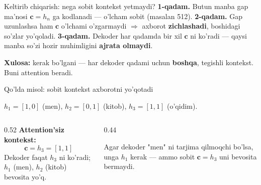 \documentclass[aspectratio=169,11pt]{beamer}
\begin{document}
\begin{frame}{Keltirib chiqarish: nega sobit kontekst yetmaydi?}
  \textbf{1-qadam.} Butun manba gap ma'nosi $\mathbf{c}=h_n$ ga kodlanadi ---
  o'lcham sobit (masalan 512).
  \pause
  \textbf{2-qadam.} Gap uzunlashsa ham $\mathbf{c}$ o'lchami o'zgarmaydi $\Rightarrow$
  axborot \textbf{zichlashadi}, boshidagi so'zlar yo'qoladi.
  \pause
  \textbf{3-qadam.} Dekoder har qadamda bir xil $\mathbf{c}$ ni ko'radi --- qaysi
  manba so'zi hozir muhimligini \textbf{ajrata olmaydi}.
  \begin{tcolorbox}[okbox,top=2pt,bottom=2pt]
    \small \textbf{Xulosa:} kerak bo'lgani --- har dekoder qadami uchun
    \textbf{boshqa}, tegishli kontekst. Buni attention beradi.
  \end{tcolorbox}
\end{frame}

\begin{frame}{Qo'lda misol: sobit kontekst axborotni yo'qotadi}
  \begin{tcolorbox}[defbox,title={Enkoder holatlari (o'lcham 2)}]
    \small $h_1=[1,0]$ (men), $h_2=[0,1]$ (kitob), $h_3=[1,1]$ (o'qidim).
  \end{tcolorbox}
  \vspace{0.2em}
  \begin{columns}[T]
    \begin{column}{0.52\textwidth}
      \textbf{Attention'siz kontekst:}
      $$ \mathbf{c} = h_3 = [1, 1] $$
      Dekoder faqat $h_3$ ni ko'radi; $h_1$ (men), $h_2$ (kitob) bevosita yo'q.
    \end{column}
    \begin{column}{0.44\textwidth}
      \begin{tcolorbox}[okbox,top=2pt,bottom=2pt]
        \footnotesize
        Agar dekoder "men" ni tarjima qilmoqchi bo'lsa, unga $h_1$ kerak --- ammo
        sobit $\mathbf{c}=h_3$ uni bevosita bermaydi.
      \end{tcolorbox}
    \end{column}
  \end{columns}
\end{frame}
\end{document}
